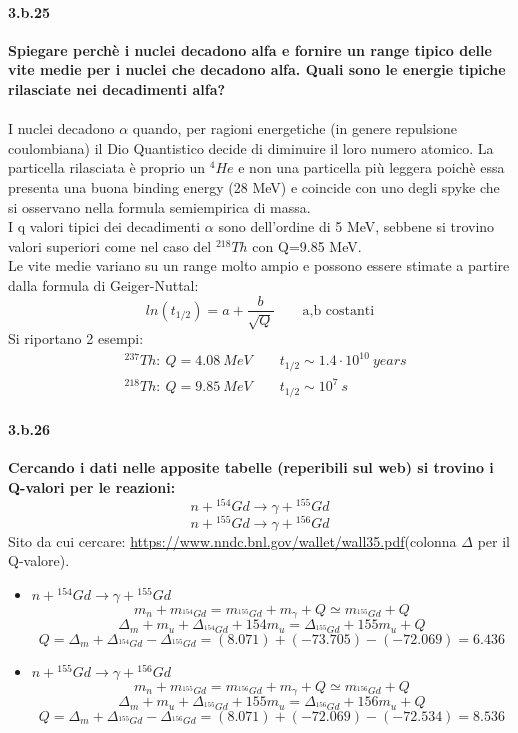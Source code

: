\documentclass[twoside]{article}
\begin{document}
\paragraph{3.b.25}\textbf{Spiegare perchè i nuclei decadono alfa e fornire un range tipico delle vite medie
per i nuclei che decadono alfa. Quali sono le energie tipiche rilasciate nei decadimenti alfa? }\\ \\
I nuclei decadono $\alpha$ quando, per ragioni energetiche (in genere repulsione coulombiana) il Dio Quantistico decide di diminuire il loro numero atomico. La particella rilasciata è proprio un $^4He$ e non una particella più leggera poichè essa presenta una buona binding energy (28 MeV) e coincide con uno degli spyke che si osservano nella formula semiempirica di massa.\\
I q valori tipici dei decadimenti $\alpha$ sono dell'ordine di 5 MeV, sebbene si trovino valori superiori come nel caso del $^{218}Th$ con Q=9.85 MeV.\\
Le vite medie variano su un range molto ampio e possono essere stimate a partire dalla formula di Geiger-Nuttal:
\begin{equation}
    ln(t_{1/2})=a+\frac{b}{\sqrt{Q}} \qquad \text{a,b costanti}
\end{equation}
Si riportano 2 esempi:
\begin{align}
    &^{237}Th:\ Q=4.08\ MeV \qquad t_{1/2}\sim 1.4 \cdot 10^{10} \ years \\
    &^{218}Th:\ Q=9.85\ MeV \qquad t_{1/2}\sim  10^{7} \ s 
\end{align}
\paragraph{3.b.26}\textbf{ Cercando i dati nelle apposite tabelle (reperibili sul web) si trovino i Q-valori per le reazioni:
\[
n+{}^{154}Gd\rightarrow \gamma +{}^{155}Gd
\]
\[
n+{}^{155}Gd\rightarrow \gamma +{}^{156}Gd
\]
}
Sito da cui cercare: \url{https://www.nndc.bnl.gov/wallet/wall35.pdf}(colonna  $\Delta$ per il Q-valore).\\
\begin{itemize}
    \item $n+{}^{154}Gd\rightarrow \gamma +{}^{155}Gd$
\[
m_n+m_{{}^{154}Gd}=m_{{}^{155}Gd} +m_{\gamma} +Q \simeq m_{{}^{155}Gd} +Q
\]
\[
\Delta_m + m_u +\Delta_{{}^{154}Gd} + 154 m_u = \Delta_{{}^{155}Gd} + 155 m_u+Q
\]
\begin{equation*}
    Q= \Delta_m + \Delta_{{}^{154}Gd} - \Delta_{{}^{155}Gd}= (8.071)+(-73.705)-(-72.069)=6.436
\end{equation*}
    \item $n+{}^{155}Gd\rightarrow \gamma +{}^{156}Gd$
 \[
m_n+m_{{}^{155}Gd}=m_{{}^{156}Gd} +m_{\gamma} +Q \simeq m_{{}^{156}Gd} +Q
\]  
\[
\Delta_m + m_u +\Delta_{{}^{155}Gd} + 155 m_u = \Delta_{{}^{156}Gd} + 156 m_u+Q
\]
\begin{equation*}
    Q= \Delta_m + \Delta_{{}^{155}Gd} - \Delta_{{}^{156}Gd}= (8.071)+(-72.069)-(-72.534)= 8.536
\end{equation*}
\end{itemize}
\end{document}
